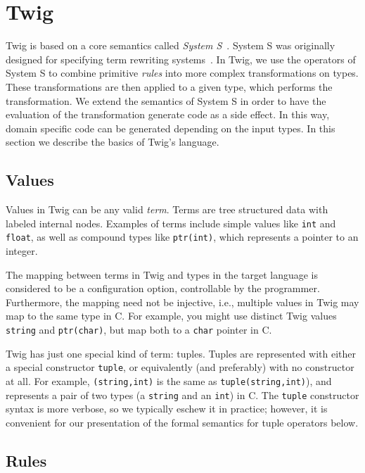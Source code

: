
\section{Twig}
\label{sec:semantics}

Twig is based on a core semantics called \emph{System S}~\cite{system-s}. System S was originally designed for specifying term rewriting systems~\cite{baader98rewriting}. In Twig, we use the operators of System S to combine primitive \emph{rules} into more complex transformations on types. These transformations are then applied to a given type, which performs the transformation. We extend the semantics of System S in order to have the evaluation of the transformation generate code as a side effect. In this way, domain specific code can be generated depending on the input types. In this section we describe the basics of Twig's language.

\subsection{Values}

Values in Twig can be any valid \emph{term}. Terms are tree structured data with labeled internal nodes. Examples of terms include simple values like \texttt{int} and \texttt{float}, as well as compound types like \texttt{ptr(int)}, which represents a pointer to an integer.

The mapping between terms in Twig and types in the target language is considered to be a configuration option, controllable by the programmer. Furthermore, the mapping need not be injective, i.e., multiple values in Twig may map to the same type in C. For example, you might use distinct Twig values \texttt{string} and \texttt{ptr(char)}, but map both to a \texttt{char} pointer in C.

Twig has just one special kind of term: tuples. Tuples are represented with either a special constructor \texttt{tuple}, or equivalently (and preferably) with no constructor at all. For example, \texttt{(string,int)} is the same as \texttt{tuple(string,int)}), and represents a pair of two types (a \texttt{string} and an \texttt{int}) in C. The \texttt{tuple} constructor syntax is more verbose, so we typically eschew it in practice; however, it is convenient for our presentation of the formal semantics for tuple operators below.

\subsection{Rules}

